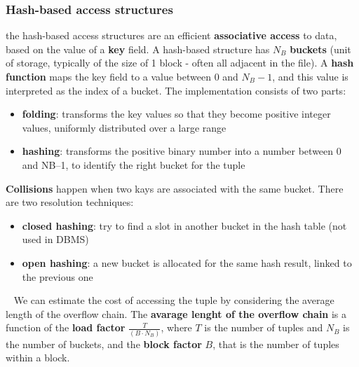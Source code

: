 \subsubsection{Hash-based access structures}
the hash-based access structures are an efficient \textbf{associative access} to data, based on the value of a \textbf{key} field.\newline
\newline
A hash-based structure has $N_B$ \textbf{buckets} (unit of storage, typically of the size of 1 block - often all adjacent in the file).\newline
\newline
A \textbf{hash function} maps the key field to a value between $0$ and $N_B-1$, and this value is interpreted as the index of a bucket.\newline
The implementation consists of two parts:
\begin{itemize}
    \item \textbf{folding}: transforms the key values so that they become
    positive integer values, uniformly distributed over a large
    range
    \item \textbf{hashing}: transforms the positive binary number into a number
    between 0 and NB–1, to identify the right bucket for the tuple
\end{itemize}
\textbf{Collisions} happen when two kays are associated with the same bucket.\newline
There are two resolution techniques:
\begin{itemize}
    \item \textbf{closed hashing}: try to find a slot in another bucket in the hash table (not used in DBMS)
    \item \textbf{open hashing}: a new bucket is allocated for the same hash result, linked to the previous one
\end{itemize}
\ \newline
We can estimate the cost of accessing the tuple by considering the average length of the overflow chain. The \textbf{avarage lenght of the overflow chain} is a function of the \textbf{load factor} $\frac{T}{(B \cdot N_B)}$, where $T$ is the number of tuples and $N_B$ is the number of buckets, and the \textbf{block factor} $B$, that is the number of tuples within a block.
